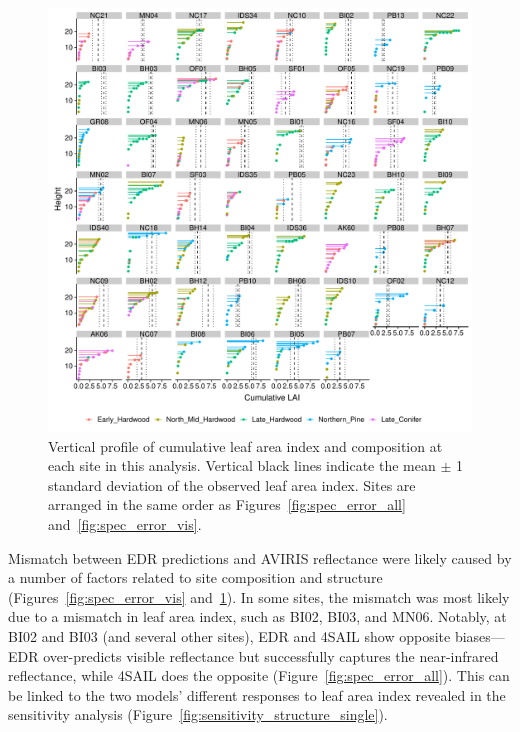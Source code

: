 \begin{figure}
  \centering
  \includegraphics[width=\textwidth]{4_edr/figures/explore_spectra/ed_cumlai_plot.pdf}
  \caption{%
    Vertical profile of cumulative leaf area index and composition at each site in this analysis.
    Vertical black lines indicate the mean $\pm$ 1 standard deviation of the observed leaf area index.
    Sites are arranged in the same order as Figures~\ref{fig:spec_error_all} and~\ref{fig:spec_error_vis}.
  }\label{fig:lai_profile}
\end{figure}

Mismatch between EDR predictions and AVIRIS reflectance were likely caused by a number of factors related to site composition and structure (Figures~\ref{fig:spec_error_vis} and~\ref{fig:lai_profile}).
In some sites, the mismatch was most likely due to a mismatch in leaf area index, such as BI02, BI03, and MN06.
Notably, at BI02 and BI03 (and several other sites), EDR and 4SAIL show opposite biases---EDR over-predicts visible reflectance but successfully captures the near-infrared reflectance, while 4SAIL does the opposite (Figure~\ref{fig:spec_error_all}).
This can be linked to the two models' different responses to leaf area index revealed in the sensitivity analysis (Figure~\ref{fig:sensitivity_structure_single}).

